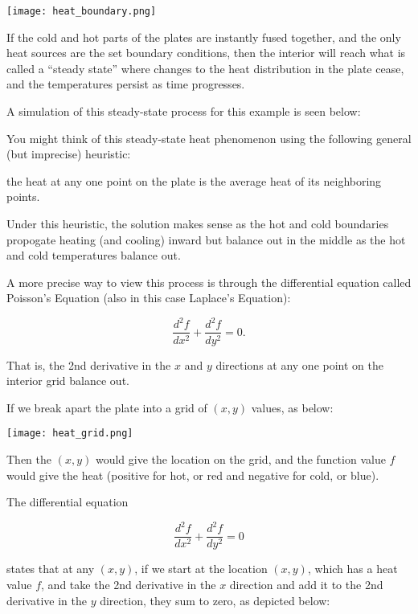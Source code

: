 \documentclass{ximera}
\begin{document}
\begin{center}
    \texttt{[image: heat\_boundary.png]}
\end{center}

If the cold and hot parts of the plates are instantly fused together, and the only heat sources are the set boundary conditions, then the interior will reach what is called a ``steady state'' where changes to the heat distribution in the plate cease, and the temperatures persist as time progresses. 

A simulation of this steady-state process for this example is seen below:

\begin{center}
\end{center}

You might think of this steady-state heat phenomenon using the following general (but imprecise) heuristic: 

the heat at any one point on the plate is the average heat of its neighboring points. 

Under this heuristic, the solution makes sense as the hot and cold boundaries propogate heating (and cooling) inward but balance out in the middle as the hot and cold temperatures balance out. 

A more precise way to view this process is through the differential equation called Poisson's Equation (also in this case Laplace's Equation): 

$$\frac{d^2f}{dx^2}+\frac{d^2f}{dy^2}=0.$$

That is, the 2nd derivative in the $x$ and $y$ directions at any one point on the interior grid balance out.

If we break apart the plate into a grid of $(x,y)$ values, as below:

\begin{center}
    \texttt{[image: heat\_grid.png]}
\end{center}

Then the $(x,y)$ would give the location on the grid, and the function value $f$ would give the heat (positive for hot, or red and negative for cold, or blue).

The differential equation 

$$\frac{d^2f}{dx^2}+\frac{d^2f}{dy^2}=0$$

states that at any $(x,y)$, if we start at the location $(x,y)$, which has a heat value $f$, and take the 2nd derivative in the $x$ direction and add it to the 2nd derivative in the $y$ direction, they sum to zero, as depicted below:
\end{document}
